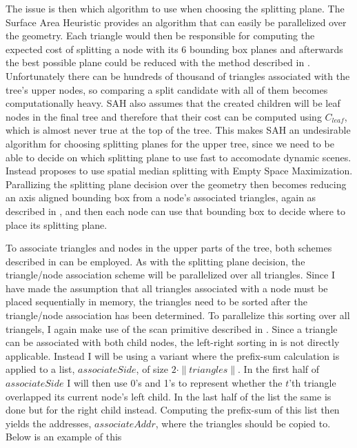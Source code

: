 The issue is then which algorithm to use when choosing the splitting plane. The
Surface Area Heuristic provides an algorithm that can easily be parallelized
over the geometry. Each triangle would then be responsible for computing the
expected cost of splitting a node with its 6 bounding box planes and afterwards
the best possible plane could be reduced with the method described in
. Unfortunately there can be hundreds of thousand of
triangles associated with the tree's upper nodes, so comparing a split candidate
with all of them becomes computationally heavy. SAH also assumes that the created
children will be leaf nodes in the final tree and therefore that their cost can
be computed using $C_{leaf}$, which is almost never true at the top of the
tree. This makes SAH an undesirable algorithm for choosing splitting planes for
the upper tree, since we need to be able to decide on which splitting plane to
use fast to accomodate dynamic scenes. Instead \zhou{} proposes to use spatial
median splitting with Empty Space Maximization. Parallizing the splitting plane
decision over the geometry then becomes reducing an axis aligned bounding box
from a node's associated triangles, again as described in
, and then each node can use that bounding box to decide
where to place its splitting plane.

To associate triangles and nodes in the upper parts of the tree, both schemes
described in  can be employed. As with the
splitting plane decision, the triangle/node association scheme will be
parallelized over all triangles. Since I have made the assumption that all
triangles associated with a node must be placed sequentially in memory, the
triangles need to be sorted after the triangle/node association has been
determined. To parallelize this sorting over all triangels, I again make use of
the scan primitive described in . Since a triangle can
be associated with both child nodes, the left-right sorting in
 is not directly applicable. Instead I will be using a
variant where the prefix-sum calculation is applied to a list, $associateSide$,
of size $2 \cdot \|triangles\|$. In the first half of $associateSide$ I will
then use 0's and 1's to represent whether the $t$'th triangle overlapped its
current node's left child. In the last half of the list the same is done but for
the right child instead. Computing the prefix-sum of this list then yields the
addresses, $associateAddr$, where the triangles should be copied to. Below is an
example of this

